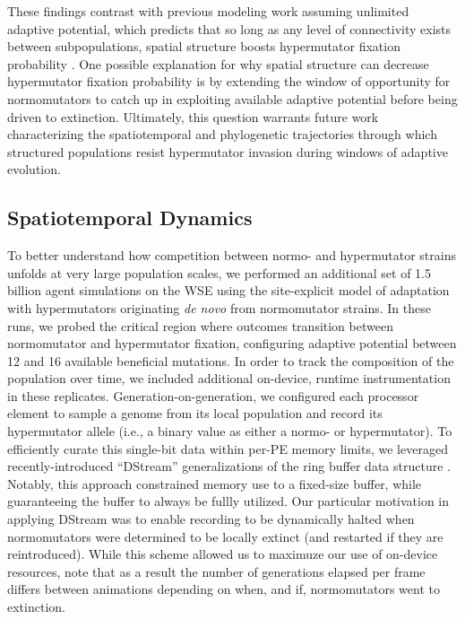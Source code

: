 These findings contrast with previous modeling work assuming unlimited adaptive potential, which predicts that so long as any level of connectivity exists between subpopulations, spatial structure boosts hypermutator fixation probability \citep{raynes2019migration}.
One possible explanation for why spatial structure can decrease hypermutator fixation probability is by extending the window of opportunity for normomutators to catch up in exploiting available adaptive potential before being driven to extinction.
Ultimately, this question warrants future work characterizing the spatiotemporal and phylogenetic trajectories through which structured populations resist hypermutator invasion during windows of adaptive evolution.

\subsection{Spatiotemporal Dynamics}
\label{sec:dynamics}

To better understand how competition between normo- and hypermutator strains unfolds at very large population scales, we performed an additional set of 1.5 billion agent simulations on the WSE using the site-explicit model of adaptation with hypermutators originating \textit{de novo} from normomutator strains.
In these runs, we probed the critical region where outcomes transition between normomutator and hypermutator fixation, configuring adaptive potential between 12 and 16 available beneficial mutations.
In order to track the composition of the population over time, we included additional on-device, runtime instrumentation in these replicates.
Generation-on-generation, we configured each processor element to sample a genome from its local population and record its hypermutator allele (i.e., a binary value as either a normo- or hypermutator).
To efficiently curate this single-bit data within per-PE memory limits, we leveraged recently-introduced ``DStream'' generalizations of the ring buffer data structure \citep{moreno2024algorithms}.
Notably, this approach constrained memory use to a fixed-size buffer, while guaranteeing the buffer to always be fullly utilized.
Our particular motivation in applying DStream was to enable recording to be dynamically halted when normomutators were determined to be locally extinct (and restarted if they are reintroduced).
While this scheme allowed us to maximuze our use of on-device resources, note that as a result the number of generations elapsed per frame differs between animations depending on when, and if, normomutators went to extinction.

